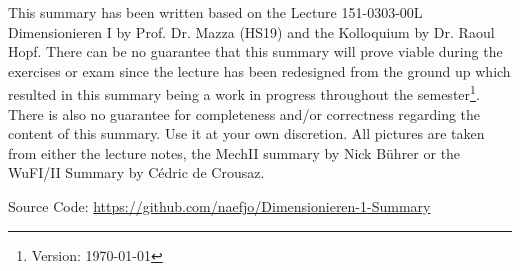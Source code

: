 



\maketitle
\begin{center}
    This summary has been written based on the Lecture 151-0303-00L  Dimensionieren I by Prof. Dr. Mazza (HS19) and the Kolloquium by Dr. Raoul Hopf. There can be no guarantee that this summary will prove viable during the exercises or exam since the lecture has been redesigned from the ground up which resulted in this summary being a work in progress throughout the semester\footnote{\label{foot:2}Version: \today}. There is also no guarantee for completeness and/or correctness regarding the content of this summary. Use it at your own discretion. All pictures are taken from either the lecture notes, the MechII summary by Nick Bührer or the WuFI/II Summary by Cédric de Crousaz.
    
    Source Code: \url{https://github.com/naefjo/Dimensionieren-1-Summary}
    
\end{center}
\newpage
\begin{multicols*}{3}






















\end{multicols*}     

